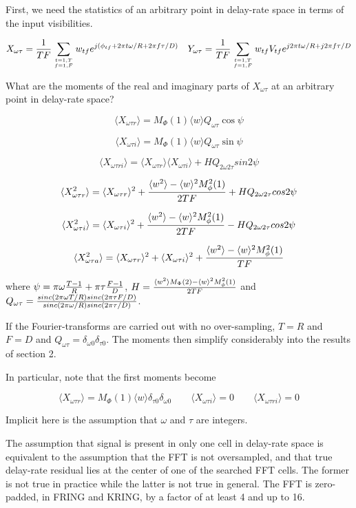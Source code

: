 First, we need the statistics of an arbitrary point in delay-rate
space in terms of the input visibilities.

$$X_{\omega\tau} = {1\over TF}\sum\limits_{t=1,T\atop f=1,F}
w_{tf}e^{j(\phi_{tf}+2\pi{t\omega/R}+2\pi{f\tau/D})} \quad
  Y_{\omega\tau} = {1\over TF}\sum\limits_{t=1,T\atop f=1,F}
w_{tf}V_{tf}e^{j2\pi t\omega/R+j2\pi f\tau/D}$$

What are the moments of the real and imaginary parts of
$X_{\omega\tau}$ at an arbitrary point in delay-rate space?

$$\langle X_{\omega\tau r}\rangle
= M_\Phi(1)\langle w\rangle Q_{\omega\tau}\cos\psi$$

$$\langle X_{\omega\tau i}\rangle
= M_\Phi(1)\langle w\rangle Q_{\omega\tau}\sin\psi$$

$$\langle X_{\omega\tau ri}\rangle
= \langle X_{\omega\tau r}\rangle\langle X_{\omega\tau i}\rangle + HQ_{2\omega2\tau}sin2\psi$$

$$\langle X_{\omega\tau r}^2\rangle
= \langle X_{\omega\tau r}\rangle ^2+ {\langle w^2\rangle -\langle w\rangle ^2M^2_\phi(1)\over2TF} + HQ_{2\omega2\tau}cos2\psi$$

$$\langle X_{\omega\tau i}^2\rangle
= \langle X_{\omega\tau i}\rangle ^2+ {\langle w^2\rangle -\langle w\rangle ^2M^2_\phi(1)\over2TF} - HQ_{2\omega2\tau}cos2\psi$$

$$\langle X_{\omega\tau a}^2\rangle
= \langle X_{\omega\tau r}\rangle ^2 + \langle X_{\omega\tau i}\rangle ^2 + {\langle w^2\rangle -\langle w\rangle ^2M^2_\phi(1)\over TF}$$

where $\psi = \pi\omega{T-1\over R} + \pi\tau{F-1\over D}$,
$H={\langle w^2\rangle M_\Phi(2)-\langle w\rangle ^2M^2_\phi(1)\over2TF}$ and
$Q_{\omega\tau} =
{sinc(2\pi\omega T/R)sinc(2\pi\tau F/D)\over sinc(2\pi\omega/R)sinc(2\pi\tau/D)}$.

If the Fourier-transforms are carried out with no over-sampling, $T=R$
and $F=D$ and $Q_{\omega\tau} = \delta_{\omega0}\delta_{\tau0}$.  The
moments then simplify considerably into the results of section 2.

In particular, note that the first moments become

$$\langle X_{\omega\tau r}\rangle = M_\Phi(1)\langle w\rangle
\delta_{\tau0}\delta_{\omega0} \qquad \langle X_{\omega\tau i}\rangle =
0 \qquad \langle X_{\omega\tau ri}\rangle = 0$$

Implicit here is the assumption that $\omega$ and $\tau$ are integers.

The assumption that signal is present in only one cell in delay-rate
space is equivalent to the assumption that the FFT is not oversampled,
and that true delay-rate residual lies at the center of one of the
searched FFT cells.  The former is not true in practice while the
latter is not true in general.  The FFT is zero-padded, in FRING and
KRING, by a factor of at least 4 and up to 16.

